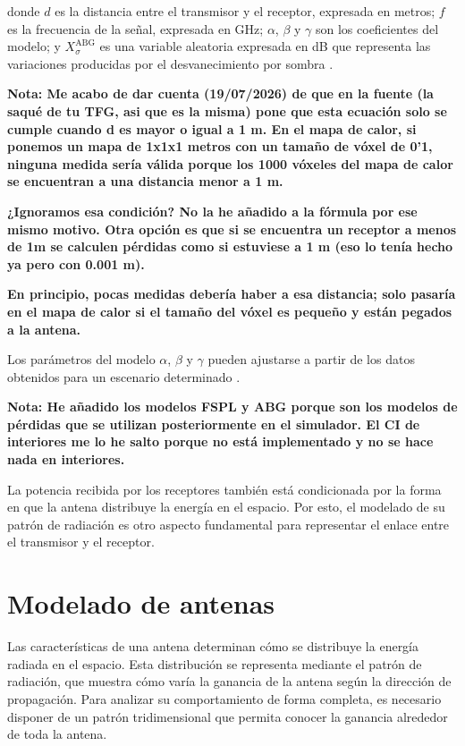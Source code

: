 donde $d$ es la distancia entre el transmisor y el receptor, expresada en metros; $f$ es la frecuencia de la señal, expresada en GHz; $\alpha$, $\beta$ y $\gamma$ son los coeficientes del modelo; y $X_{\sigma}^{\mathrm{ABG}}$ es una variable aleatoria expresada en dB que representa las variaciones producidas por el desvanecimiento por sombra \cite{abg}.

\par\medskip
\textbf{Nota: Me acabo de dar cuenta (19/07/2026) de que en la fuente (la saqué de  tu TFG, asi que es la misma) pone que esta ecuación solo se cumple cuando d es mayor o igual a 1 m. En el mapa de calor, si ponemos un mapa de 1x1x1 metros con un tamaño de vóxel de 0'1, ninguna medida sería válida porque los 1000 vóxeles del mapa de calor se encuentran a una distancia menor a 1 m.}

\textbf{¿Ignoramos esa condición? No la he añadido a la fórmula por ese mismo motivo. Otra opción es que si se encuentra un receptor a menos de 1m se calculen pérdidas como si estuviese a 1 m (eso lo tenía hecho ya pero con 0.001 m).}

\textbf{En principio, pocas medidas debería haber a esa distancia; solo pasaría en el mapa de calor si el tamaño del vóxel es pequeño y están pegados a la antena.}
\par\medskip

Los parámetros del modelo $\alpha$, $\beta$ y $\gamma$ pueden ajustarse a partir de los datos obtenidos para un escenario determinado \cite{abg}.

\par\medskip
\textbf{Nota: He añadido los modelos FSPL y ABG porque son los modelos de pérdidas que se utilizan posteriormente en el simulador. El CI de interiores me lo he salto porque no está implementado y no se hace nada en interiores.}
\par\medskip


La potencia recibida por los receptores también está condicionada por la forma en que la antena distribuye la energía en el espacio. Por esto, el modelado de su patrón de radiación es otro aspecto fundamental para representar el enlace entre el transmisor y el receptor.


\section{Modelado de antenas}

Las características de una antena determinan cómo se distribuye la energía radiada en el espacio. Esta distribución se representa mediante el patrón de radiación, que muestra cómo varía la ganancia de la antena según la dirección de propagación. Para analizar su comportamiento de forma completa, es necesario disponer de un patrón tridimensional que permita conocer la ganancia alrededor de toda la antena.

